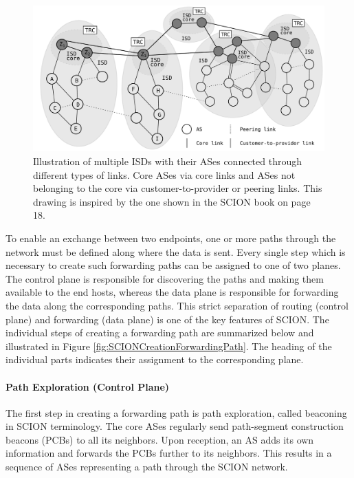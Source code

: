 \begin{figure}
	\begin{center}
		\def\svgwidth{1\textwidth}
		\includegraphics[scale=0.24]{../illustrations/importantConcepts/SCIONISDsAndASes.pdf} 
		\caption[]{Illustration of multiple ISDs with their ASes connected through different types of links. Core ASes via core links and ASes not belonging to the core via customer-to-provider or peering links. This drawing is inspired by the one shown in the SCION book \cite{SCIONBook} on page 18.}
		\label{fig:SCIONArchitectureISDs}
	\end{center}
\end{figure}

To enable an exchange between two endpoints, one or more paths through the network must be defined along where the data is sent. Every single step which is necessary to create such forwarding paths can be assigned to one of two planes. The control plane is responsible for discovering the paths and making them available to the end hosts, whereas the data plane is responsible for forwarding the data along the corresponding paths. This strict separation of routing (control plane) and forwarding (data plane) is one of the key features of SCION. The individual steps of creating a forwarding path are summarized below and illustrated in Figure \ref{fig:SCIONCreationForwardingPath}. The heading of the individual parts indicates their assignment to the corresponding plane.

\paragraph{Path Exploration (Control Plane)}

The first step in creating a forwarding path is path exploration, called beaconing in SCION terminology. The core ASes regularly send path-segment construction beacons (PCBs) to all its neighbors. Upon reception, an AS adds its own information and forwards the PCBs further to its neighbors. This results in a sequence of ASes representing a path through the SCION network. 

